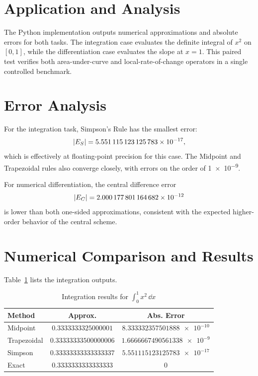 \documentclass[letterpaper,twocolumn,fleqn]{article}
\begin{document}
\section{Application and Analysis}
The Python implementation outputs numerical approximations and absolute errors for both tasks. The integration case evaluates the definite integral of $x^2$ on $[0,1]$, while the differentiation case evaluates the slope at $x=1$. This paired test verifies both area-under-curve and local-rate-of-change operators in a single controlled benchmark.

\section{Error Analysis}
For the integration task, Simpson's Rule has the smallest error:
\[
\abs{E_S}=\num{5.551115123125783e-17},
\]
which is effectively at floating-point precision for this case. The Midpoint and Trapezoidal rules also converge closely, with errors on the order of \num{1e-9}.

For numerical differentiation, the central difference error
\[
\abs{E_C}=\num{2.000177801164682e-12}
\]
is lower than both one-sided approximations, consistent with the expected higher-order behavior of the central scheme.

\section{Numerical Comparison and Results}
Table~\ref{tab:integration} lists the integration outputs.

\begin{table}[h!]
\caption{Integration results for $\int_0^1 x^2\,\dd x$}
\label{tab:integration}
\centering
{\small
\setlength{\tabcolsep}{3pt}
\begin{tabular}{|l|c|c|}
\hline
Method & Approx. & Abs. Error \\\hline
Midpoint & $\num{0.3333333325000001}$ & $\num{8.333332357501888e-10}$ \\\hline
Trapezoidal & $\num{0.33333333500000006}$ & $\num{1.6666667490561338e-9}$ \\\hline
Simpson & $\num{0.33333333333333337}$ & $\num{5.551115123125783e-17}$ \\\hline
Exact & $\num{0.3333333333333333}$ & $\num{0}$ \\\hline
\end{tabular}
}
\end{table}
\end{document}
